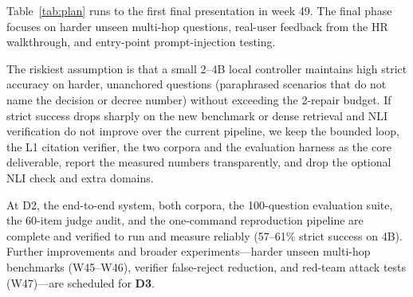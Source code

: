 Table~\ref{tab:plan} runs to the first final presentation in week 49. The final phase focuses on harder unseen multi-hop questions, real-user feedback from the HR walkthrough, and entry-point prompt-injection testing.

 The riskiest assumption is that a small 2--4B local controller maintains high strict accuracy on harder, unanchored questions (paraphrased scenarios that do not name the decision or decree number) without exceeding the 2-repair budget. If strict success drops sharply on the new benchmark or dense retrieval and NLI verification do not improve over the current pipeline, we keep the bounded loop, the L1 citation verifier, the two corpora and the evaluation harness as the core deliverable, report the measured numbers transparently, and drop the optional NLI check and extra domains.

 At D2, the end-to-end system, both corpora, the 100-question evaluation suite, the 60-item judge audit, and the one-command reproduction pipeline are complete and verified to run and measure reliably (57--61\% strict success on 4B). Further improvements and broader experiments—harder unseen multi-hop benchmarks (W45--W46), verifier false-reject reduction, and red-team attack tests (W47)—are scheduled for \textbf{D3}.
